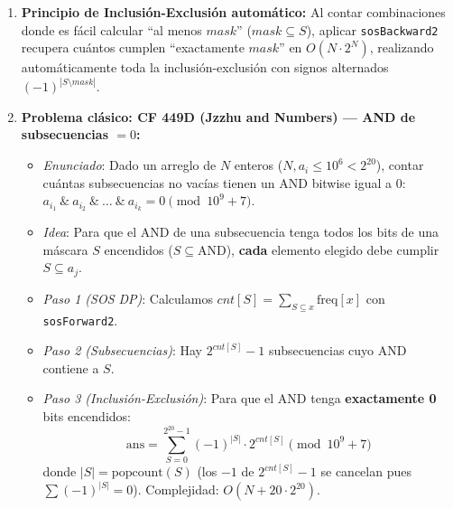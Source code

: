 \begin{enumerate}
  \item \textbf{Principio de Inclusi\'on-Exclusi\'on autom\'atico:}
  Al contar combinaciones donde es f\'acil calcular ``al menos $mask$'' ($mask \subseteq S$), aplicar \texttt{sosBackward2} recupera cu\'antos cumplen ``exactamente $mask$'' en $O(N \cdot 2^N)$, realizando autom\'aticamente toda la inclusi\'on-exclusi\'on con signos alternados $(-1)^{|S \setminus mask|}$.

  \item \textbf{Problema cl\'asico: CF 449D (Jzzhu and Numbers) --- AND de subsecuencias $= 0$:}
  \begin{itemize}
    \item \emph{Enunciado}: Dado un arreglo de $N$ enteros ($N, a_i \le 10^6 < 2^{20}$), contar cu\'antas subsecuencias no vac\'ias tienen un AND bitwise igual a 0:
    $a_{i_1} \ \& \ a_{i_2} \ \& \ \dots \ \& \ a_{i_k} = 0 \pmod{10^9+7}$.
    \item \emph{Idea}: Para que el AND de una subsecuencia tenga todos los bits de una m\'ascara $S$ encendidos ($S \subseteq \text{AND}$), \textbf{cada} elemento elegido debe cumplir $S \subseteq a_j$.
    \item \emph{Paso 1 (SOS DP)}: Calculamos $cnt[S] = \sum_{S \subseteq x} \text{freq}[x]$ con \texttt{sosForward2}.
    \item \emph{Paso 2 (Subsecuencias)}: Hay $2^{cnt[S]} - 1$ subsecuencias cuyo AND contiene a $S$.
    \item \emph{Paso 3 (Inclusi\'on-Exclusi\'on)}: Para que el AND tenga \textbf{exactamente 0} bits encendidos:
    $$\text{ans} = \sum_{S = 0}^{2^{20}-1} (-1)^{|S|} \cdot 2^{cnt[S]} \pmod{10^9+7}$$
    donde $|S| = \text{popcount}(S)$ (los $-1$ de $2^{cnt[S]}-1$ se cancelan pues $\sum (-1)^{|S|} = 0$). Complejidad: $O(N + 20 \cdot 2^{20})$.
  \end{itemize}
\end{enumerate}

